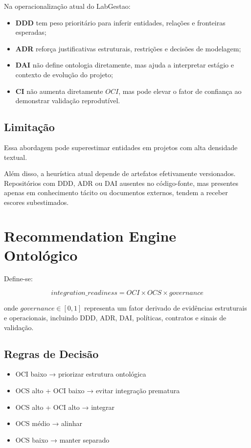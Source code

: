 \documentclass[12pt,a4paper]{article}
\begin{document}
Na operacionalização atual do LabGestao:

\begin{itemize}
	\item \textbf{DDD} tem peso prioritário para inferir entidades, relações e fronteiras esperadas;
	\item \textbf{ADR} reforça justificativas estruturais, restrições e decisões de modelagem;
	\item \textbf{DAI} não define ontologia diretamente, mas ajuda a interpretar estágio e contexto de evolução do projeto;
	\item \textbf{CI} não aumenta diretamente \(OCI\), mas pode elevar o fator de confiança ao demonstrar validação reprodutível.
\end{itemize}

\subsection{Limitação}

Essa abordagem pode superestimar entidades em projetos com alta densidade textual.

Além disso, a heurística atual depende de artefatos efetivamente versionados. Repositórios com DDD, ADR ou DAI ausentes no código-fonte, mas presentes apenas em conhecimento tácito ou documentos externos, tendem a receber escores subestimados.


\section{Recommendation Engine Ontológico}

Define-se:

\[
integration\_readiness = OCI \times OCS \times governance
\]

onde \(governance \in [0,1]\) representa um fator derivado de evidências estruturais e operacionais, incluindo DDD, ADR, DAI, políticas, contratos e sinais de validação.

\subsection{Regras de Decisão}

\begin{itemize}
	\item OCI baixo → priorizar estrutura ontológica
	\item OCS alto + OCI baixo → evitar integração prematura
	\item OCS alto + OCI alto → integrar
	\item OCS médio → alinhar
	\item OCS baixo → manter separado
\end{itemize}
\end{document}
